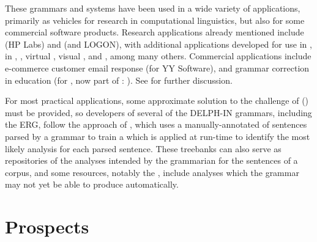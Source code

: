 \documentclass[output=paper,biblatex,babelshorthands,newtxmath,draftmode,colorlinks,citecolor=brown]{langscibook}
\begin{document}
These grammars and systems have been used in a wide variety of applications, primarily as vehicles
for research in computational linguistics, but also for some commercial software products.  Research
applications already mentioned include  (HP Labs) and 
(\verbmobil and LOGON), with additional applications developed for use in 
\citep*{Sch:Kie:Spu:11},  in  \citep*{Hellanetal:13},
 \citep{Herb:Cope:06}, virtual  \citep{packard2014uw},
visual  \citep{DBLP:journals/corr/KuhnleC17}, and 
\citep{Flickinger:17}, among many others.  Commercial applications include e-commerce customer
  email response (for YY Software), and grammar correction in education (for , now part of : \citealt*{suppes2014teach}).  See
 for further discussion.

For most practical applications, some approximate solution to the challenge of 
() must be provided, so developers of several of the DELPH-IN grammars,
including the ERG, follow the approach of \citet*{OFTM2004a-u}, which uses a manually-annotated
 of sentences parsed by a grammar to train a  which is applied
at run-time to identify the most likely analysis for each parsed sentence.  These treebanks can also
serve as repositories of the analyses intended by the grammarian for the sentences of a corpus, and
some resources, notably the  \citep*{BvNM2001a-u}, include analyses which the
grammar may not yet be able to produce automatically.

\section{Prospects}
\end{document}
